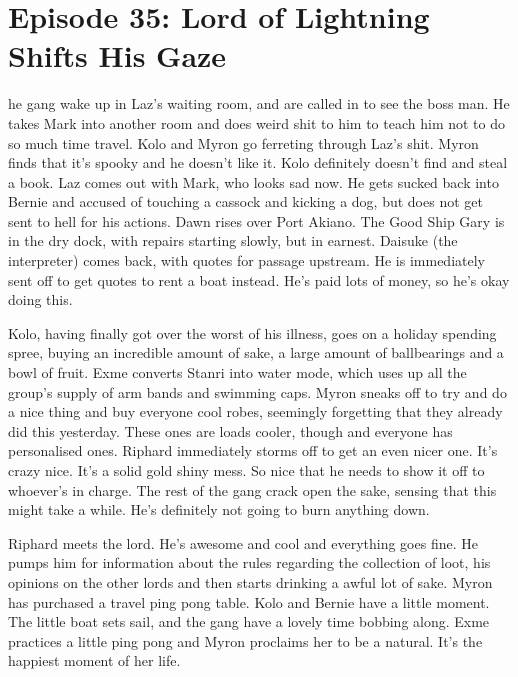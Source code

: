 \section{Episode 35: Lord of Lightning Shifts His Gaze}

\medskip

he gang wake up in Laz’s waiting room, and are called in to see the boss man. He takes Mark into another room and does weird shit to him to teach him not to do so much time travel. Kolo and Myron go ferreting through Laz’s shit. Myron finds that it’s spooky and he doesn’t like it. Kolo definitely doesn’t find and steal a book. Laz comes out with Mark, who looks sad now. He gets sucked back into Bernie and accused of touching a cassock and kicking a dog, but does not get sent to hell for his actions. Dawn rises over Port Akiano. The Good Ship Gary is in the dry dock, with repairs starting slowly, but in earnest. Daisuke (the interpreter) comes back, with quotes for passage upstream. He is immediately sent off to get quotes to rent a boat instead. He’s paid lots of money, so he’s okay doing this.\medskip

Kolo, having finally got over the worst of his illness, goes on a holiday spending spree, buying an incredible amount of sake, a large amount of ballbearings and a bowl of fruit. Exme converts Stanri into water mode, which uses up all the group’s supply of arm bands and swimming caps. Myron sneaks off to try and do a nice thing and buy everyone cool robes, seemingly forgetting that they already did this yesterday. These ones are loads cooler, though and everyone has personalised ones. Riphard immediately storms off to get an even nicer one. It’s crazy nice. It’s a solid gold shiny mess. So nice that he needs to show it off to whoever’s in charge. The rest of the gang crack open the sake, sensing that this might take a while. He’s definitely not going to burn anything down.\medskip

Riphard meets the lord. He’s awesome and cool and everything goes fine. He pumps him for information about the rules regarding the collection of loot, his opinions on the other lords and then starts drinking a awful lot of sake. Myron has purchased a travel ping pong table. Kolo and Bernie have a little moment. The little boat sets sail, and the gang have a lovely time bobbing along. Exme practices a little ping pong and Myron proclaims her to be a natural. It’s the happiest moment of her life.\medskip

